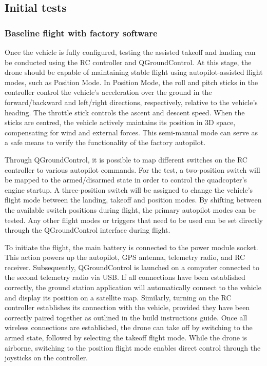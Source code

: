 \subsection{Initial tests}
\label{sec:test-8-flight}


\subsubsection{Baseline flight with factory software}
\label{subsec:fl-test-1}

Once the vehicle is fully configured, testing the assisted takeoff and landing can be conducted using the RC controller and QGroundControl. At this stage, the drone should be capable of maintaining stable flight using autopilot-assisted flight modes, such as Position Mode. In Position Mode, the roll and pitch sticks in the controller control the vehicle's acceleration over the ground in the forward/backward and left/right directions, respectively, relative to the vehicle's heading. The throttle stick controls the ascent and descent speed. When the sticks are centred, the vehicle actively maintains its position in 3D space, compensating for wind and external forces. This semi-manual mode can serve as a safe means to verify the functionality of the factory autopilot.


Through QGroundControl, it is possible to map different switches on the RC controller to various autopilot commands. For the test, a two-position switch will be mapped to the armed/disarmed state in order to control the quadcopter's engine startup. A three-position switch will be assigned to change the vehicle's flight mode between the landing, takeoff and position modes. By shifting between the available switch positions during flight, the primary autopilot modes can be tested. Any other flight modes or triggers that need to be used can be set directly through the QGroundControl interface during flight.


To initiate the flight, the main battery is connected to the power module socket. This action powers up the autopilot, GPS antenna, telemetry radio, and RC receiver. Subsequently, QGroundControl is launched on a computer connected to the second telemetry radio via USB. If all connections have been established correctly, the ground station application will automatically connect to the vehicle and display its position on a satellite map. Similarly, turning on the RC controller establishes its connection with the vehicle, provided they have been correctly paired together as outlined in the build instructions guide. Once all wireless connections are established, the drone can take off by switching to the armed state, followed by selecting the takeoff flight mode. While the drone is airborne, switching to the position flight mode enables direct control through the joysticks on the controller.


